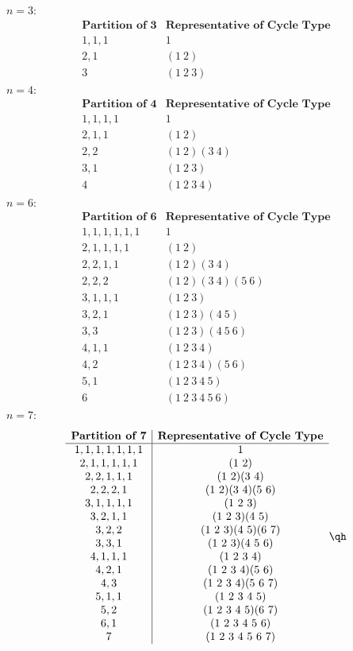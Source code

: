 \begin{sol}
	$n = 3$:
	\[\begin{array}{c|c}
		\textbf{Partition of 3} & \textbf{Representative of Cycle Type} \\
		\hline
		1, 1, 1 & 1 \\
		2, 1 & (1\ 2) \\
		3 & (1\ 2\ 3)
	\end{array}\]
	$n = 4$:
	\[\begin{array}{c|c}
		\textbf{Partition of 4} & \textbf{Representative of Cycle Type} \\
		\hline
		1, 1, 1, 1 & 1 \\
		2, 1, 1 & (1\ 2) \\
		2, 2 & (1\ 2)(3\ 4) \\
		3, 1 & (1\ 2\ 3) \\
		4 & (1\ 2\ 3\ 4)
	\end{array}\]
	$n = 6$:
	\[\begin{array}{c|c}
		\textbf{Partition of 6} & \textbf{Representative of Cycle Type} \\
		\hline
		1, 1, 1, 1, 1, 1 & 1 \\
		2, 1, 1, 1, 1 & (1\ 2) \\
		2, 2, 1, 1 & (1\ 2)(3\ 4) \\
		2, 2, 2 & (1\ 2)(3\ 4)(5\ 6) \\
		3, 1, 1, 1 & (1\ 2\ 3) \\
		3, 2, 1 & (1\ 2\ 3)(4\ 5) \\
		3, 3 & (1\ 2\ 3)(4\ 5\ 6) \\
		4, 1, 1 & (1\ 2\ 3\ 4) \\
		4, 2 & (1\ 2\ 3\ 4)(5\ 6) \\
		5, 1 & (1\ 2\ 3\ 4\ 5) \\
		6 & (1\ 2\ 3\ 4\ 5\ 6)
	\end{array}\]
	$n = 7$:
	\[\begin{array}{c|c}
		\textbf{Partition of 7} & \textbf{Representative of Cycle Type} \\
		\hline
		1, 1, 1, 1, 1, 1, 1 & 1 \\
		2, 1, 1, 1, 1, 1 & (1\ 2) \\
		2, 2, 1, 1, 1 & (1\ 2)(3\ 4) \\
		2, 2, 2, 1 & (1\ 2)(3\ 4)(5\ 6) \\
		3, 1, 1, 1, 1 & (1\ 2\ 3) \\
		3, 2, 1, 1 & (1\ 2\ 3)(4\ 5) \\
		3, 2, 2 & (1\ 2\ 3)(4\ 5)(6\ 7) \\
		3, 3, 1 & (1\ 2\ 3)(4\ 5\ 6) \\
		4, 1, 1, 1 & (1\ 2\ 3\ 4) \\
		4, 2, 1 & (1\ 2\ 3\ 4)(5\ 6) \\
		4, 3 & (1\ 2\ 3\ 4)(5\ 6\ 7) \\
		5, 1, 1 & (1\ 2\ 3\ 4\ 5) \\
		5, 2 & (1\ 2\ 3\ 4\ 5)(6\ 7) \\
		6, 1 & (1\ 2\ 3\ 4\ 5\ 6) \\
		7 & (1\ 2\ 3\ 4\ 5\ 6\ 7)
	\end{array} \qh\]
\end{sol}

